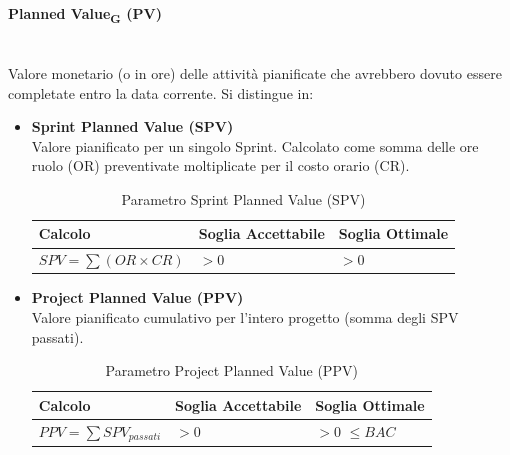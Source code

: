 \documentclass[11pt,a4paper]{article}
\begin{document}
\paragraph{Planned Value\textsubscript{G} (PV)} \hfill \\
Valore monetario (o in ore) delle attività pianificate che avrebbero dovuto essere completate entro la data corrente. Si distingue in:
\begin{itemize}
    \item \textbf{Sprint Planned Value (SPV)} \\
    Valore pianificato per un singolo Sprint. Calcolato come somma delle ore ruolo (OR) preventivate moltiplicate per il costo orario (CR).
    
    \begin{table}[H]
        \centering
        \renewcommand{\arraystretch}{1.5} %
        \begin{tabular}{|M{0.4\textwidth}|M{0.25\textwidth}|M{0.25\textwidth}|}
            \hline
            \textbf{Calcolo} & \textbf{Soglia Accettabile} & \textbf{Soglia Ottimale} \\
            \hline
            $SPV = \sum (OR \times CR)$ & $> 0$ & $> 0$ \\
            \hline
        \end{tabular}
        \caption{Parametro Sprint Planned Value (SPV)}
    \end{table}

    \item \textbf{Project Planned Value (PPV)} \\
    Valore pianificato cumulativo per l'intero progetto (somma degli SPV passati).
    
    \begin{table}[H]
        \centering
        \renewcommand{\arraystretch}{1.5} %
        \begin{tabular}{|M{0.4\textwidth}|M{0.25\textwidth}|M{0.25\textwidth}|}
            \hline
            \textbf{Calcolo} & \textbf{Soglia Accettabile} & \textbf{Soglia Ottimale} \\
            \hline
            $PPV = \sum SPV_{passati}$ & $> 0$ & $> 0$ \newline $\le BAC$ \\
            \hline
        \end{tabular}
        \caption{Parametro Project Planned Value (PPV)}
    \end{table}
\end{itemize}
\end{document}
